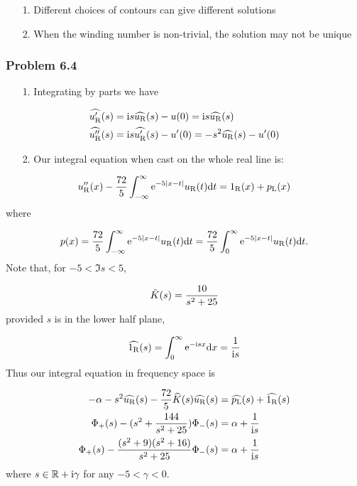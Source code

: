 \documentclass[12pt,a4paper]{article}
\def\D{ {\rm d} }
\def\I{ {\rm i} }
\def\E{ {\rm e} }
\def\R{ {\mathbb R} }
\def\dx{\D x}
\def\dt{\D t}
\def\rR{ {\rm R} }
\def\rL{ {\rm L} }
\begin{document}
\begin{itemize}
\item[1. ] Different choices of contours can give different solutions


\item[2. ] When the winding number is non-trivial, the solution may not be unique

\end{itemize}
\subsubsection{Problem 6.4}
\begin{itemize}
\item[1. ] Integrating by parts we have

\end{itemize}

\begin{align*}
\widehat{u_\rR'}(s) &= \I s \widehat{u_\rR}(s) - u(0) = \I s \widehat{u_\rR}(s) \\
\widehat{u_\rR''}(s) &= \I s \widehat{u_\rR'}(s) - u'(0)  = -s^2 \widehat{u_\rR}(s) - u'(0)
\end{align*}
\begin{itemize}
\item[2. ] Our integral equation when cast on the whole real line is:

\end{itemize}
\[
u_\rR''(x) - {72 \over 5} \int_{-\infty}^\infty \E^{-5 |x-t|} u_\rR(t)\dt = 1_\rR(x) + p_\rL(x)
\]
where

\[
p(x) = {72 \over 5} \int_{-\infty}^\infty \E^{-5 |x-t|} u_\rR(t)\dt =  {72 \over 5} \int_0^\infty \E^{-5 |x-t|} u_\rR(t)\dt.
\]
Note that, for $-5 <\Im s < 5$,

\[
\hat K(s) = {10 \over s^2 + 25}
\]
provided $s$ is in the lower half plane,

\[
\widehat{1_\rR}(s) = \int_0^\infty \E^{-\I s x} \dx = {1 \over \I s}
\]
Thus our integral equation in frequency space is


\begin{align*}
-\alpha - s^2 \widehat{u_\rR}(s) -  {72 \over 5} \widehat K(s) \widehat{u_\rR}(s) &=\widehat{p_\rL}(s) +  \widehat{1_\rR}(s)\\
\Phi_+(s) - (s^2 +   {144 \over s^2+25}) \Phi_-(s) &= \alpha + {1 \over \I s}\\
\Phi_+(s) -  {(s^2 + 9) (s^2+16) \over s^2+25} \Phi_-(s) &= \alpha + {1 \over \I s}
\end{align*}
where $s \in \R +\I \gamma$ for any $-5 < \gamma < 0$.
\end{document}

